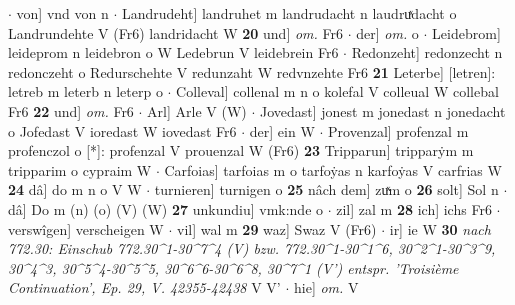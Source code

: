 \documentclass[8pt,a4paper,notitlepage]{article}
\begin{document}
\begin{table}[ht]
\begin{minipage}[t]{0.5\linewidth}
$\cdot$ von] vnd von n  $\cdot$ Landrudeht] landruhet m landrudacht n laudruͯdacht o Landrundehte V (Fr6) landridacht W \textbf{20} und] \textit{om.} Fr6  $\cdot$ der] \textit{om.} o  $\cdot$ Leidebrom] leideprom n leidebron o W Ledebrun V leidebrein Fr6  $\cdot$ Redonzeht] redonzecht n redonczeht o Redurschehte V redunzaht W redvnzehte Fr6 \textbf{21} Leterbe] [letren]: letreb m leterb n leterp o  $\cdot$ Colleval] collenal m n o kolefal V colleual W collebal Fr6 \textbf{22} und] \textit{om.} Fr6  $\cdot$ Arl] Arle V (W)  $\cdot$ Jovedast] jonest m jonedast n jonedacht o Jofedast V ioredast W iovedast Fr6  $\cdot$ der] ein W  $\cdot$ Provenzal] profenzal m profenczol o [*]: profenzal V prouenzal W (Fr6) \textbf{23} Tripparun] tripparẏm m tripparim o cypraim W  $\cdot$ Carfoias] tarfoias m o tarfoẏas n karfoẏas V carfrias W \textbf{24} dâ] do m n o V W  $\cdot$ turnieren] turnigen o \textbf{25} nâch dem] zuͯm o \textbf{26} solt] Sol n  $\cdot$ dâ] Do m (n) (o) (V) (W) \textbf{27} unkundiu] vmk:nde o  $\cdot$ zil] zal m \textbf{28} ich] ichs Fr6  $\cdot$ verswîgen] verscheigen W  $\cdot$ vil] wal m \textbf{29} waz] Swaz V (Fr6)  $\cdot$ ir] ie W \textbf{30} \textit{nach 772.30: Einschub 772.30\textasciicircum1-30\textasciicircum7\textasciicircum4 (V) bzw. 772.30\textasciicircum1-30\textasciicircum1\textasciicircum6, 30\textasciicircum2\textasciicircum1-30\textasciicircum3\textasciicircum9, 30\textasciicircum4\textasciicircum3, 30\textasciicircum5\textasciicircum4-30\textasciicircum5\textasciicircum5, 30\textasciicircum6\textasciicircum6-30\textasciicircum6\textasciicircum8, 30\textasciicircum7\textasciicircum1 (V') entspr. 'Troisième Continuation', Ep. 29, V. 42355-42438} V V'   $\cdot$ hie] \textit{om.} V \newline
\end{minipage}
\end{table}
\newpage
\end{document}
